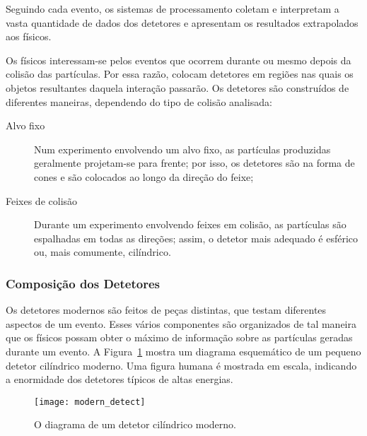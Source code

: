 Seguindo cada evento, os sistemas de processamento coletam e interpretam a
vasta quantidade de dados dos detetores e apresentam os resultados extrapolados
aos físicos.

Os físicos interessam-se pelos eventos que ocorrem durante ou mesmo depois da
colisão das partículas. Por essa razão, colocam detetores em regiões nas quais
os objetos resultantes daquela interação passarão. Os detetores são construídos
de diferentes maneiras, dependendo do tipo de colisão analisada:

\begin{description}
\item[Alvo fixo] Num experimento envolvendo um alvo fixo, as partículas
produzidas geralmente projetam-se para frente; por isso, os detetores são na
forma de cones e são colocados ao longo da direção do feixe;

\item[Feixes de colisão] Durante um experimento envolvendo feixes em
co\-li\-são, as par\-tí\-cu\-las são espalhadas em todas as direções; assim, o
detetor mais adequado é esférico ou, mais comumente, cilíndrico.
\end{description}

\subsubsection{Composição dos Detetores}

Os detetores modernos são feitos de peças distintas, que testam diferentes
aspectos de um evento. Esses vários componentes são organizados de tal maneira
que os físicos possam obter o máximo de informação sobre as partículas geradas
durante um evento. A Figura~\ref{fig:modern-detect} mostra um diagrama
esquemático de um pequeno detetor cilíndrico moderno. Uma figura humana é
mostrada em escala, indicando a enormidade dos detetores típicos de altas
energias.

\begin{figure}
\begin{center}
\texttt{[image: modern\_detect]}
\end{center}
\caption{O diagrama de um detetor cilíndrico moderno.}
\label{fig:modern-detect}
\end{figure}

